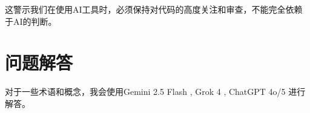 \documentclass[UTF8]{report}
\theoremstyle{MyLineTheoremStyle} %
\theoremstyle{MyBlockTheoremStyle} %
\theoremstyle{MySubsubsectionStyle} %
\begin{document}
这警示我们在使用AI工具时，必须保持对代码的高度关注和审查，不能完全依赖于AI的判断。

\section{问题解答}

对于一些术语和概念，我会使用Gemini 2.5 Flash , Grok 4 , ChatGPT 4o/5 进行解答。










% 



\end{document}
